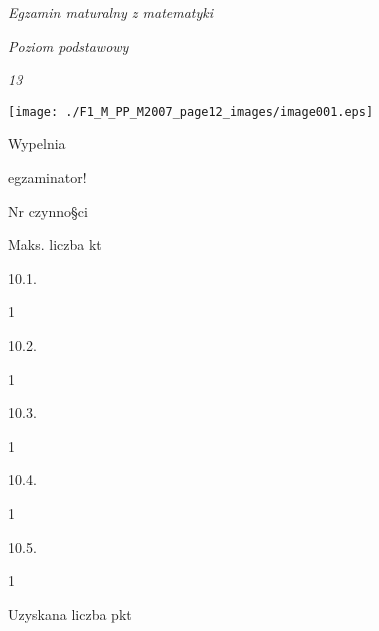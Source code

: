 \documentclass[a4paper,12pt]{article}
\begin{document}
{\it Egzamin maturalny z matematyki}

{\it Poziom podstawowy}

{\it 13}
\begin{center}
\texttt{[image: ./F1\_M\_PP\_M2007\_page12\_images/image001.eps]}
\end{center}
Wypelnia

egzaminator!

Nr czynno\S ci

Maks. liczba kt

10.1.

1

10.2.

1

10.3.

1

10.4.

1

10.5.

1

Uzyskana liczba pkt
\end{document}
